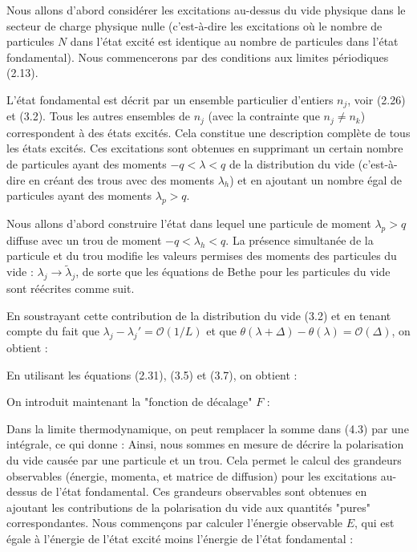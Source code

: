 Nous allons d'abord considérer les excitations au-dessus du vide physique dans le secteur de charge physique nulle (c'est-à-dire les excitations où le nombre de particules \( N \) dans l'état excité est identique au nombre de particules dans l'état fondamental). Nous commencerons par des conditions aux limites périodiques (2.13).

L'état fondamental est décrit par un ensemble particulier d'entiers \( n_j \), voir (2.26) et (3.2). Tous les autres ensembles de \( n_j \) (avec la contrainte que \( n_j \neq n_k \)) correspondent à des états excités. Cela constitue une description complète de tous les états excités. Ces excitations sont obtenues en supprimant un certain nombre de particules ayant des moments \( -q < \lambda < q \) de la distribution du vide (c'est-à-dire en créant des trous avec des moments \( \lambda_h \)) et en ajoutant un nombre égal de particules ayant des moments \( \lambda_p > q \).

Nous allons d'abord construire l'état dans lequel une particule de moment \( \lambda_p > q \) diffuse avec un trou de moment \( -q < \lambda_h < q \). La présence simultanée de la particule et du trou modifie les valeurs permises des moments des particules du vide : \( \lambda_j \to \tilde{\lambda}_j \), de sorte que les équations de Bethe pour les particules du vide sont réécrites comme suit.

En soustrayant cette contribution de la distribution du vide (3.2) et en tenant compte du fait que \( \lambda_j - \lambda_j' = \mathcal{O}(1/L) \) et que \( \theta( \lambda + \Delta) - \theta(\lambda) = \mathcal{O}(\Delta) \), on obtient :

En utilisant les équations (2.31), (3.5) et (3.7), on obtient :

On introduit maintenant la "fonction de décalage" \( F \) :

Dans la limite thermodynamique, on peut remplacer la somme dans (4.3) par une intégrale, ce qui donne :
Ainsi, nous sommes en mesure de décrire la polarisation du vide causée par une particule et un trou. Cela permet le calcul des grandeurs observables (énergie, momenta, et matrice de diffusion) pour les excitations au-dessus de l'état fondamental. Ces grandeurs observables sont obtenues en ajoutant les contributions de la polarisation du vide aux quantités "pures" correspondantes. Nous commençons par calculer l'énergie observable \( E \), qui est égale à l'énergie de l'état excité moins l'énergie de l'état fondamental :\\

